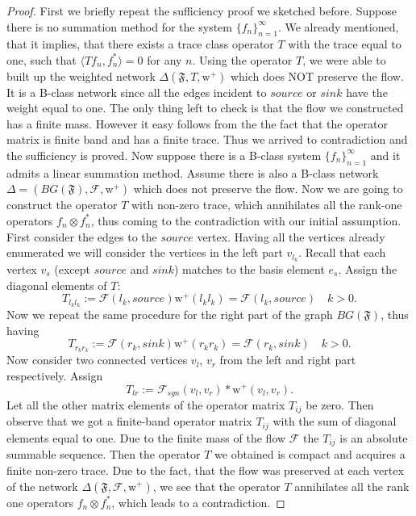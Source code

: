 \documentclass[12pt]{article}
\newcommand\inner[2]{\langle #1, #2 \rangle}
\theoremstyle{definition}
\newcommand{\seq}[1]{\{{#1}_n\}_{n=1}^\infty}
\newcommand{\fsys}{\mathfrak{F}}
\newcommand{\wtpos}{\mathrm{w}^+}
\newcommand{\flow}{\mathcal{F}}
\newcommand{\flowsgn}{\mathcal{F}_{sgn}}
\newcommand{\source}{\mathit{source}}
\newcommand{\sink}{\mathit{sink}}
\newcommand{\net}{\Delta}
\numberwithin{remark}{section}
\numberwithin{theorem}{section}
\numberwithin{prop}{section}
\numberwithin{equation}{section}
\numberwithin{lemma}{section}
\numberwithin{prop_under_lemma}{lemma}
\begin{document}
    \begin{proof}
      First we briefly repeat the sufficiency proof we sketched before.
      Suppose there is no summation method for the system $\seq{f}$.
      We already mentioned, that it implies, that there exists a trace class operator $T$ with
      the trace equal to one, such that $\inner{Tf_n}{f_n^*} = 0$ for any $n$.
      Using the operator $T$, we were able to built up the weighted network
      $\net(\fsys, T, \wtpos)$ which does NOT preserve the flow. 
      It is a B-class network since all the edges incident to $\source$ or $\sink$ have the weight
      equal to one.
      The only thing left to check is that the flow we constructed has a finite mass.
      However it easy follows from the the fact that the operator matrix is finite band and has a finite trace.
      Thus we arrived to contradiction and the sufficiency is proved.
      Now suppose there is a B-class system $\seq{f}$ and it admits a linear summation method.
      Assume there is also a B-class network $\net = (BG(\fsys), \flow, \wtpos)$ which does not preserve the flow.
      Now we are going to construct the operator $T$ with non-zero trace, which annihilates all the rank-one
      operators $f_n \otimes f^*_n$, thus coming to the contradiction with our initial assumption.
      First consider the edges to the $\source$ vertex. Having all the vertices already enumerated
      we will consider the vertices in the left part $v_{l_k}$.
      Recall that each vertex $v_s$ (except $\source$ and $\sink$) matches to the basis element $e_s$.
      Assign the diagonal elements of $T$:
      $$
        T_{l_k l_k} := \flow(l_k, \source) \wtpos(l_k l_k) = \flow(l_k, \source) \quad k > 0.
      $$
      Now we repeat the same procedure for the right part of the graph $BG(\fsys)$, thus having
      $$
        T_{r_k r_k} := \flow(r_k, \sink) \wtpos(r_k r_k) = \flow(r_k, \sink) \quad k > 0.
      $$
      Now consider two connected vertices $v_l$, $v_r$ from the left and right part
      respectively. Assign
      $$
        T_{lr} := \flowsgn(v_l, v_r) * \wtpos(v_l, v_r).
      $$
      Let all the other matrix elements of the operator matrix $T_{ij}$ be zero.
      Then observe that we got a finite-band operator matrix $T_{ij}$ with the sum of diagonal elements
      equal to one.
      Due to the finite mass of the flow $\flow$ the $T_{ij}$ is an absolute summable sequence.
      Then the operator $T$ we obtained is compact and acquires a finite non-zero trace.
      Due to the fact, that the flow was preserved at each vertex of the network $\net(\fsys, \flow, \wtpos)$,
      we see that the operator $T$ annihilates all the rank one operators $f_n \otimes f^*_n$,
      which leads to a contradiction.
    \end{proof}
    
\end{document}
